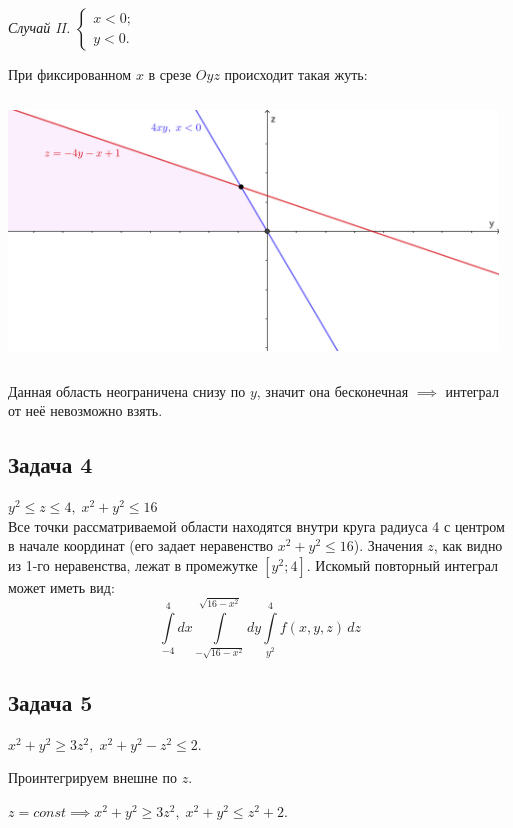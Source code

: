 \documentclass[a4paper, fleqn]{article}
\begin{document}
   \textit{Случай II.} $\begin{cases}
   x < 0;\\
   y < 0.
   \end{cases}$
   
   При фиксированном $x$ в срезе $Oyz$ происходит такая жуть:
   
   \includegraphics[width=13cm, height=7cm]{list24imgs/task 2.4.5-2.png}
    
    Данная область неограничена снизу по $y$, значит она бесконечная $\implies$ интеграл от неё невозможно взять.
    
    \subsection*{Задача 4}
    
    $y^2 \le z \le 4, \; x^2 + y^2 \le 16$\\
    
    Все точки рассматриваемой области находятся внутри круга радиуса 4 с центром в начале координат (его задает неравенство $x^2 + y^2 \le 16$). Значения $z$, как видно из 1-го неравенства, лежат в промежутке $[y^2; 4]$. Искомый повторный интеграл может иметь вид:
    \[ \int\limits_{-4}^{4} dx \int\limits_{-\sqrt{16-x^2}}^{\sqrt{16-x^2}} dy \int\limits_{y^2}^{4} f(x, y, z)\, dz  \]
    
    \subsection*{Задача 5}
    
    $x^2 + y^2 \geq 3 z^2, \; x^2 + y^2 - z^2 \leq 2. $
    
    Проинтегрируем внешне по $z$. 
    
    $z = const \implies x^2 + y^2 \geq 3z^2, \; x^2 + y^2 \leq z^2 + 2.$
    
\end{document}
